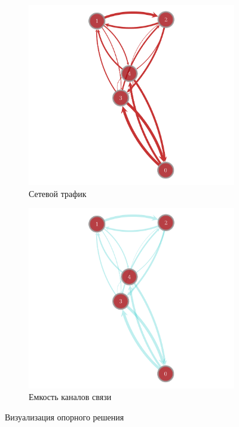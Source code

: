 \documentclass[14pt,a4paper,titlepage]{extarticle}
\begin{document}
\begin{figure}[h]
\centering
    \begin{subfigure}{0.49\textwidth}
        \includegraphics[width=\textwidth]{initial_mu}
        \caption{Сетевой трафик}
        \label{fig:initial_mu}
    \end{subfigure}
    \begin{subfigure}{0.49\textwidth}
        \includegraphics[width=\textwidth]{initial_lambda}
        \caption{Емкость каналов связи}
        \label{fig:initial_lambda}
    \end{subfigure}
    \caption{Визуализация опорного решения}\label{fig:initial_solution}
\end{figure}
\end{document}
